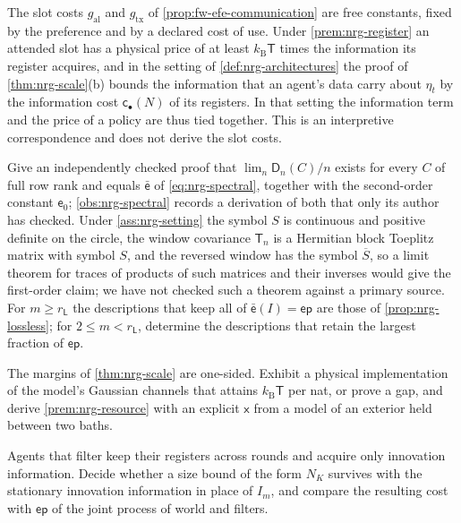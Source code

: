 \begin{remark}\label{rem:nrg-efe}
The slot costs $g_{\mathrm{al}}$ and $g_{\mathrm{tx}}$ of \cref{prop:fw-efe-communication} are free constants, fixed by the preference and by a declared cost of use. Under \cref{prem:nrg-register} an attended slot has a physical price of at least $k_{\mathrm B}\mathsf T$ times the information its register acquires, and in the setting of \cref{def:nrg-architectures} the proof of \cref{thm:nrg-scale}(b) bounds the information that an agent's data carry about $\eta_t$ by the information cost $\mathsf c_\bullet(N)$ of its registers. In that setting the information term and the price of a policy are thus tied together. This is an interpretive correspondence and does not derive the slot costs.
\end{remark}

\begin{openproblem}\label{open:nrg-rate}
Give an independently checked proof that $\lim_n\mathsf D_n(C)/n$ exists for every $C$ of full row rank and equals $\bar{\mathsf e}$ of \cref{eq:nrg-spectral}, together with the second-order constant $\mathsf e_0$; \cref{obs:nrg-spectral} records a derivation of both that only its author has checked. Under \cref{ass:nrg-setting} the symbol $S$ is continuous and positive definite on the circle, the window covariance $\mathsf T_n$ is a Hermitian block Toeplitz matrix with symbol $S$, and the reversed window has the symbol $\overline S$, so a limit theorem for traces of products of such matrices and their inverses would give the first-order claim; we have not checked such a theorem against a primary source. For $m\ge r_{\mathsf L}$ the descriptions that keep all of $\bar{\mathsf e}(I)=\mathsf{ep}$ are those of \cref{prop:nrg-lossless}; for $2\le m<r_{\mathsf L}$, determine the descriptions that retain the largest fraction of $\mathsf{ep}$.
\end{openproblem}

\begin{openproblem}\label{open:nrg-tight}
The margins of \cref{thm:nrg-scale} are one-sided. Exhibit a physical implementation of the model's Gaussian channels that attains $k_{\mathrm B}\mathsf T$ per nat, or prove a gap, and derive \cref{prem:nrg-resource} with an explicit $\mathsf x$ from a model of an exterior held between two baths.
\end{openproblem}

\begin{openproblem}\label{open:nrg-dynamic}
Agents that filter keep their registers across rounds and acquire only innovation information. Decide whether a size bound of the form $N_K$ survives with the stationary innovation information in place of $I_m$, and compare the resulting cost with $\mathsf{ep}$ of the joint process of world and filters.
\end{openproblem}

